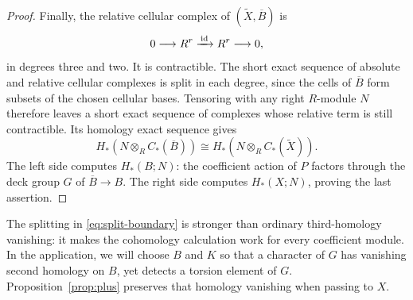 \begin{proof}
Finally, the relative cellular complex of $(\widetilde X,\overline B)$
is
\begin{equation}\label{eq:relative-complex}
 0\longrightarrow R^r\xrightarrow{\,\operatorname{id}\,}R^r
   \longrightarrow0,
\end{equation}
in degrees three and two. It is contractible. The short exact sequence
of absolute and relative cellular complexes is split in each degree,
since the cells of $\overline B$ form subsets of the chosen cellular
bases. Tensoring with any right $R$-module $N$ therefore leaves a short
exact sequence of complexes whose relative term is still contractible.
Its homology exact sequence gives
\[
 H_*(N\otimes_R C_*(\overline B))
   \cong H_*(N\otimes_R C_*(\widetilde X)).
\]
The left side computes $H_*(B;N)$: the coefficient action of $P$
factors through the deck group $G$ of $\overline B\to B$.
The right side computes $H_*(X;N)$, proving the last assertion.
\end{proof}

The splitting in \eqref{eq:split-boundary} is stronger than ordinary
third-homology vanishing: it makes the cohomology calculation work for
every coefficient module. In the application, we will choose $B$ and
$K$ so that a character of $G$ has vanishing second homology on $B$,
yet detects a torsion element of $G$. Proposition~\ref{prop:plus}
preserves that homology vanishing when passing to $X$.
